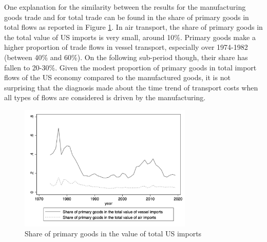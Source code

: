 \documentclass[11pt,twoside, authoryear]{elsarticle}
\begin{document}
One explanation for the similarity between the results for the manufacturing goods trade and for total trade can be found in the share of primary goods in total flows as reported in Figure \ref{fig:Share_prim_goods}. In air transport, the share of primary goods in the total value of US imports is very small, around 10\%. Primary goods make a higher proportion of trade flows in vessel transport, especially over 1974-1982 (between 40\% and 60\%). On the following sub-period though, their share has fallen to 20-30\%. Given the modest proportion of primary goods in total import flows of the US economy compared to the manufactured goods, it is not surprising that the diagnosis made about the time trend of transport costs when all types of flows are considered is driven by the manufacturing.

\begin{figure}[htbp]
\caption{Share of primary goods in the value of total US imports}
\label{fig:Share_prim_goods}
\begin{center}
\includegraphics[height=6cm]
{../Share_of_primary.jpg}
\end{center}
\end{figure}



\end{document}
